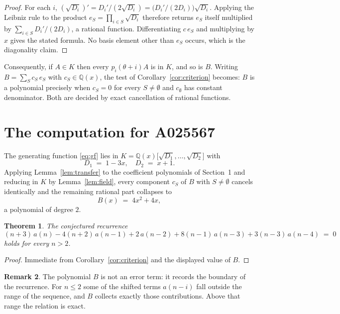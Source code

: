 \documentclass[11pt,a4paper]{article}
\theoremstyle{plain}
\newtheorem{theorem}{Theorem}
\theoremstyle{definition}
\newtheorem{remark}[theorem]{Remark}
\begin{document}
\begin{proof}
For each $i$, $(\sqrt{D_{i}})'=D_{i}'/(2\sqrt{D_{i}})=\bigl(D_{i}'/(2D_{i})\bigr)\sqrt{D_{i}}$.
Applying the Leibniz rule to the product $e_{S}=\prod_{i\in S}\sqrt{D_{i}}$ therefore
returns $e_{S}$ itself multiplied by $\sum_{i\in S}D_{i}'/(2D_{i})$, a rational function.
Differentiating $c\,e_{S}$ and multiplying by $x$ gives the stated formula. No basis
element other than $e_{S}$ occurs, which is the diagonality claim.
\end{proof}

Consequently, if $A\in K$ then every $p_{i}(\theta+i)A$ is in $K$, and so is $B$. Writing
$B=\sum_{S}c_{S}\,e_{S}$ with $c_{S}\in\mathbb{Q}(x)$, the test of
Corollary~\ref{cor:criterion} becomes: $B$ is a polynomial precisely when $c_{S}=0$ for
every $S\neq\emptyset$ and $c_{\emptyset}$ has constant denominator. Both are decided by
exact cancellation of rational functions.

\section{The computation for A025567}

The generating function \eqref{eq:gf} lies in $K=\mathbb{Q}(x)\bigl[\sqrt{D_{1}},\dots,\sqrt{D_{2}}\bigr]$ with
\[
D_{1} \;=\; 1 - 3 x,\quad D_{2} \;=\; x + 1 .
\]
Applying Lemma~\ref{lem:transfer} to the coefficient polynomials of Section~1 and reducing
in $K$ by Lemma~\ref{lem:field}, every component $c_{S}$ of $B$ with $S\neq\emptyset$
cancels identically and the remaining rational part collapses to
\[
B(x)\;=\;4 x^{2} + 4 x ,
\]
a polynomial of degree $2$.

\begin{theorem}
The conjectured recurrence
\[
(n + 3)\,a(n) -  4 \left(n + 2\right)\,a(n-1) + 2\,a(n-2) + 8 \left(n - 1\right)\,a(n-3) + 3 \left(n - 3\right)\,a(n-4) \;=\;0
\]
holds for every $n>2$.
\end{theorem}

\begin{proof}
Immediate from Corollary~\ref{cor:criterion} and the displayed value of $B$.
\end{proof}

\begin{remark}
The polynomial $B$ is not an error term: it records the boundary of the recurrence. For
$n\le2$ some of the shifted terms $a(n-i)$ fall outside the range of the sequence,
and $B$ collects exactly those contributions. Above that range the relation is exact.
\end{remark}
\end{document}

